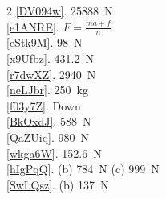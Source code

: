 \documentclass{article}
\numberwithin{equation}{section}
\numberwithin{figure}{section}
\begin{document}
\begin{multicols}{2}
\ref{DV094w}. \SI{25888}{N}\\
\ref{e1ANRE}. $F = \frac{ma + f}{n}$\\
\ref{eStk9M}. \SI{98}{N}\\
\ref{x9Ufbz}. \SI{431.2}{N}\\
\ref{r7dwXZ}. \SI{2940}{N}\\
\ref{neLJbr}. \SI{250}{kg}\\
\ref{f03y7Z}. Down\\
\ref{BkOxdJ}. \SI{588}{N}\\
\ref{QaZUiq}. \SI{980}{N}\\
\ref{wkga6W}. \SI{152.6}{N}\\
\ref{hIgPqQ}. (b) \SI{784}{N} \hspace{1em} (c) \SI{999}{N}\\
\ref{SwLQsz}. (b) \SI{137}{N}\\


\end{multicols}
\end{document}
